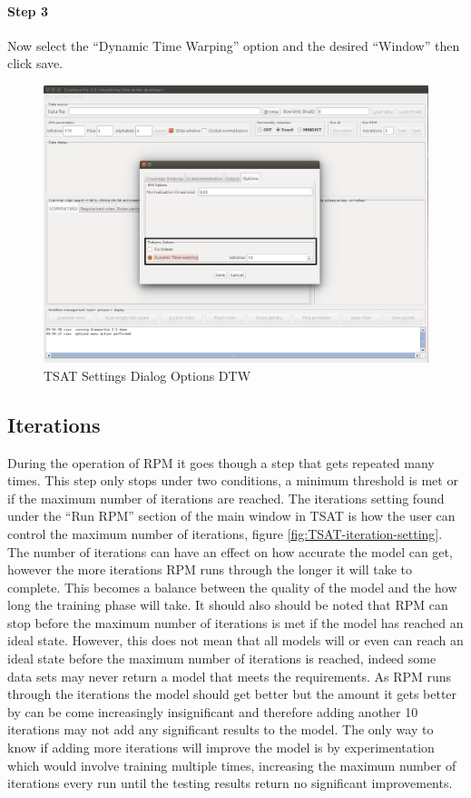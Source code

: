 \documentclass[letterpaper, 12pt]{article}
\begin{document}
\newpage
\paragraph{Step 3}
Now select the ``Dynamic Time Warping'' option and the desired ``Window'' then click save.

\begin{figure}[H]
  \includegraphics[width=\textwidth]{TSAT-settings-dialog-options-dtw}
  \caption{TSAT Settings Dialog Options DTW}
  \label{fig:TSAT-settings-dialog-options-dtw}
\end{figure}

\newpage
\subsection{Iterations}
During the operation of RPM it goes though a step that gets repeated many times. This step only stops under two conditions, a minimum threshold is met or if the maximum number of iterations are reached. The iterations setting found under the ``Run RPM'' section of the main window in TSAT is how the user can control the maximum number of iterations, figure \ref{fig:TSAT-iteration-setting}. The number of iterations can have an effect on how accurate the model can get, however the more iterations RPM runs through the longer it will take to complete. This becomes a balance between the quality of the model and the how long the training phase will take. It should also should be noted that RPM can stop before the maximum number of iterations is met if the model has reached an ideal state. However, this does not mean that all models will or even can reach an ideal state before the maximum number of iterations is reached, indeed some data sets may never return a model that meets the requirements. As RPM runs through the iterations the model should get better but the amount it gets better by can be come increasingly insignificant and therefore adding another 10 iterations may not add any significant results to the model. The only way to know if adding more iterations will improve the model is by experimentation which would involve training multiple times, increasing the maximum number of iterations every run until the testing results return no significant improvements.
\end{document}
